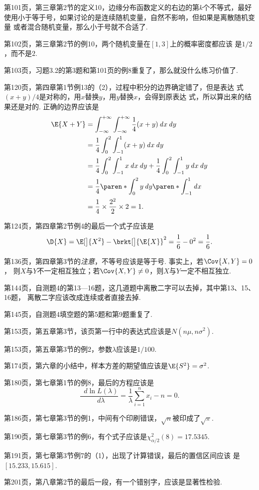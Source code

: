 \documentclass[a4paper]{ctexart}
\newcommand*{\diff}{\mathop{}\!\mathit{d}}
\newcommand*{\dx}{\diff x}
\newcommand*{\dy}{\diff y}
\newcommand*{\dd}[2][]{\frac{\diff#1}{\diff#2}}
\begin{document}
第101页，第三章第2节的定义10，边缘分布函数定义的右边的第\(k\)个不等式，最好
使用小于等于号，如果讨论的是连续随机变量，自然不影响，但如果是离散随机变量
或者混合随机变量，那么小于号就不合适了.

第102页，第三章第2节的例10，两个随机变量在\([1, 3]\)上的概率密度都应该
是\(1/2\)，而不是\(2\).

第103页，习题3.2的第3题和第101页的例8重复了，那么就没什么练习价值了.

第120页，第四章第1节例13的（2），过程中积分的边界确定错了，但是表达
式\((x+y)/4\)是对称的，用\(x\)替换\(y\)，用\(y\)替换\(x\)，会得到原表达
式，所以算出来的结果还是对的.  正确的边界应该是
\begin{align*}
  \E{X + Y}
    &= \int_{-\infty}^{+\infty} \int_{-\infty}^{+\infty} \frac14 (x+y) \dx\dy \\
    &= \frac14 \int_0^2 \int_{-1}^1 (x+y) \dx\dy \\
    &= \frac14 \int_0^2 \int_{-1}^1 x \dx\dy + \frac14 \int_0^2 \int_{-1}^1 y \dx\dy \\
    &= \frac14 \paren*{\int_0^2 y \dy} \paren*{\int_{-1}^1 \dx} \\
    &= \frac14 \times \frac{2^2}{2} \times 2 = 1.
\end{align*}

第124页，第四章第2节例4的最后一个式子应该是
\[
  \D{X} = \E[\big]{X^2} - \brkt[\big]{\E{X}}^2 = \frac16 - 0^2 = \frac16.
\]

第136页，第四章第3节的\emph{注意}，不等号应该是等于号.  事实上，若\(\Cov{X, Y} = 0\)，
则\(X\)与\(Y\)不一定相互独立；若\(\Cov{X, Y} \ne 0\)，则\(X\)与\(Y\)一定不相互独立.

第144页，自测题4的第13—16题，这几道题中离散二字可以去掉，其中第13、15、16题，
离散二字应该改成连续或者直接去掉.

第145页，自测题4填空题的第5题和第9题重复了.

第153页，第五章第3节，该页第一行中的表达式应该是\(N(n\mu, n\sigma^2)\).

第153页，第五章第3节的例2，参数\(\lambda\)应该是\(1/100\).

第174页，第六章的小结中，样本方差的期望值应该是\(\E{S^2} = \sigma^2\).

第180页，第七章第1节的例8，最后的方程应该是
\[
  \dd[\ln L(\lambda)]\lambda = \frac{1}{\lambda} \sum_{i=1}^n x_i - n = 0.
\]

第186页，第七章第3节的例1，中间有个印刷错误，\(\sqrt n\)被印成了\(\sqrt\pi\).

第190页，第七章第3节的例6，有个式子应该是\(\chi_{\alpha/2}^2 (8) = \num{17.5345}\).

第191页，第七章第3节例7的（1），出现了计算错误，最后的置信区间应该
是\([15.233, 15.615]\).

第201页，第八章第2节的最后一段，有一个错别字，应该是显著性检验.
\end{document}
